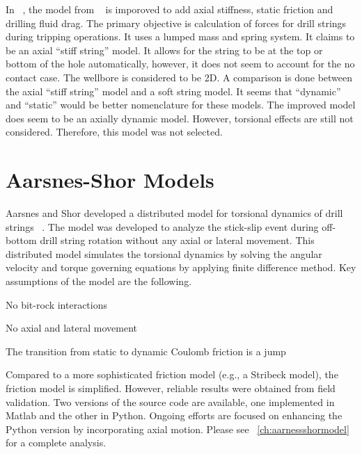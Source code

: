 In ~\cite{ref:zamanipour2018a}, the model from  ~\cite{ref:miska2015a} is imporoved to add axial stiffness, static friction and drilling fluid drag.  The primary objective is calculation of forces for drill strings during tripping operations.  It uses a lumped mass and spring system.  It claims to be an axial ``stiff string'' model.  It allows for the string to be at the top or bottom of the hole automatically, however, it does not seem to account for the no contact case.  The wellbore is considered to be 2D.  A comparison is done between the axial ``stiff string'' model and a soft string model.  It seems that ``dynamic'' and ``static'' would be better nomenclature for these models.  The improved model does seem to be an axially dynamic model.  However, torsional effects are still not considered.  Therefore, this model was not selected.



\section{Aarsnes-Shor Models}
Aarsnes and Shor developed a distributed model for torsional dynamics of drill strings ~\cite{ref:aarsnes2017a}.  The model was developed to analyze the stick-slip event during off-bottom drill string rotation without any axial or lateral movement.  This distributed model simulates the torsional dynamics by solving the angular velocity and torque governing equations by applying finite difference method. Key assumptions of the model are the following.
\begin{bulletedlist}
	\item No bit-rock interactions
	\item No axial and lateral movement
	\item The transition from static to dynamic Coulomb friction is a jump
\end{bulletedlist}
Compared to a more sophisticated friction model (e.g., a Stribeck model), the friction model is simplified.  However, reliable results were obtained from field validation.  Two versions of the source code are available, one implemented in Matlab and the other in Python.  Ongoing efforts are focused on enhancing the Python version by incorporating axial motion.  Please see \chaptername~\ref{ch:aarnessshormodel} for a complete analysis.


